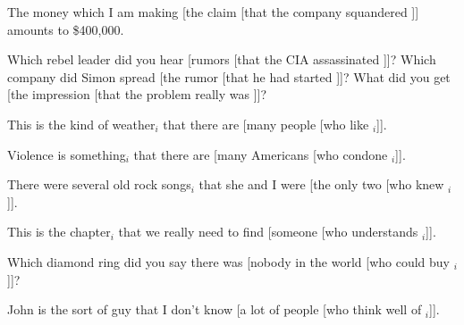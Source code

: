 \documentclass[output=paper
                ,modfonts
                ,nonflat
	        ,collection
	        ,collectionchapter
	        ,collectiontoclongg
 	        ,biblatex
                ,babelshorthands
                ,newtxmath
                ,draftmode
                ,colorlinks, citecolor=brown
]{./langsci/langscibook}
\begin{document}

\eal
 \label{csubok}
\ex The money which I am making [the claim [that the company squandered \spc]] amounts to \$400,000.\\
 \citep[206, 207]{pollardsag}

\ex  Which rebel leader did you hear [rumors [that the CIA assassinated \spc]]?
\ex Which company did Simon spread [the rumor [that he had started \spc]]?
\ex What did you get [the impression [that the problem really was \spc]]?\\
\citep{kluender}
\zlcont

\ealcont \label{csubok2}
\ex This is the kind of weather$_i$ that there are [many people [who like \spc$_i$]].\\
\citep{shirlappin}

\ex Violence is something$_i$ that there are [many Americans [who condone \spc$_i$]].\\
\citep[108]{mccawley81}

\ex There were several old rock songs$_i$ that she and I were [the only two [who
knew \spc$_i$]].\\
\citep{chungmc}

\ex This is the chapter$_i$ that we really need to find [someone [who understands \spc$_i$]].\\
\citep[238]{kluender92}

\ex Which diamond ring did you say there was [nobody in the world [who could
buy \spc$_i$]]?\\
\citep[206]{pollardsag}

\ex John is the sort of guy that I don't know [a lot of people [who think well of
\spc$_i$]].\\
\citep[230]{culicover99}
\zl
\end{document}
